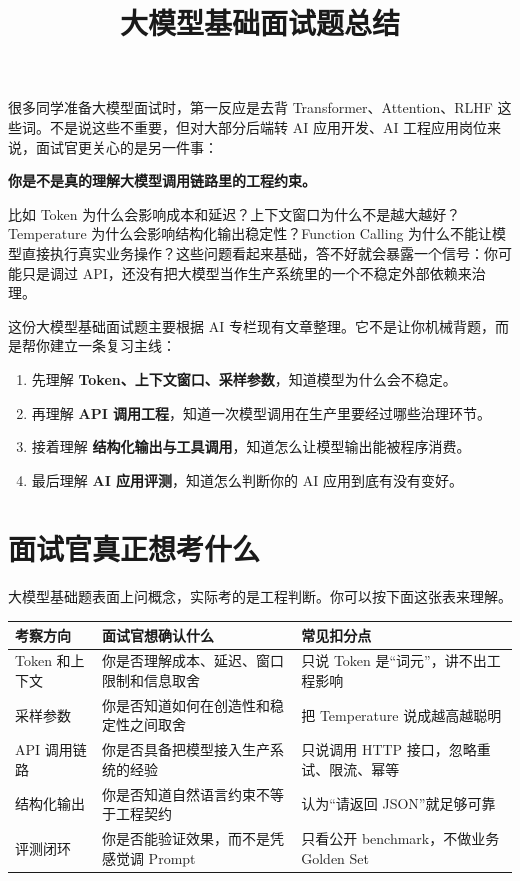 \documentclass[9pt,a4paper,twocolumn]{ctexart}
\begin{document}
\title{大模型基础面试题总结}
\date{}
\maketitle
{}

很多同学准备大模型面试时，第一反应是去背 Transformer、Attention、RLHF 这些词。不是说这些不重要，但对大部分后端转 AI 应用开发、AI 工程应用岗位来说，面试官更关心的是另一件事：



\textbf{你是不是真的理解大模型调用链路里的工程约束。}



比如 Token 为什么会影响成本和延迟？上下文窗口为什么不是越大越好？Temperature 为什么会影响结构化输出稳定性？Function Calling 为什么不能让模型直接执行真实业务操作？这些问题看起来基础，答不好就会暴露一个信号：你可能只是调过 API，还没有把大模型当作生产系统里的一个不稳定外部依赖来治理。



这份大模型基础面试题主要根据 AI 专栏现有文章整理。它不是让你机械背题，而是帮你建立一条复习主线：


\begin{enumerate}[itemsep=1pt, topsep=2pt]
  \item 先理解 \textbf{Token、上下文窗口、采样参数}，知道模型为什么会不稳定。
  \item 再理解 \textbf{API 调用工程}，知道一次模型调用在生产里要经过哪些治理环节。
  \item 接着理解 \textbf{结构化输出与工具调用}，知道怎么让模型输出能被程序消费。
  \item 最后理解 \textbf{AI 应用评测}，知道怎么判断你的 AI 应用到底有没有变好。
\end{enumerate}


\section*{面试官真正想考什么}


大模型基础题表面上问概念，实际考的是工程判断。你可以按下面这张表来理解。


{\footnotesize
\begin{tabular}{|p{}|p{}|p{}|}
\hline
\textbf{考察方向} & \textbf{面试官想确认什么} & \textbf{常见扣分点} \\
\hline
Token 和上下文 & 你是否理解成本、延迟、窗口限制和信息取舍 & 只说 Token 是“词元”，讲不出工程影响 \\
\hline
采样参数 & 你是否知道如何在创造性和稳定性之间取舍 & 把 Temperature 说成越高越聪明 \\
\hline
API 调用链路 & 你是否具备把模型接入生产系统的经验 & 只说调用 HTTP 接口，忽略重试、限流、幂等 \\
\hline
结构化输出 & 你是否知道自然语言约束不等于工程契约 & 认为“请返回 JSON”就足够可靠 \\
\hline
评测闭环 & 你是否能验证效果，而不是凭感觉调 Prompt & 只看公开 benchmark，不做业务 Golden Set \\
\hline
\end{tabular}
}
\end{document}
